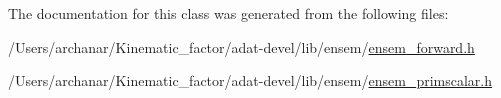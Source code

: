 The documentation for this class was generated from the following files\+:\begin{DoxyCompactItemize}
\item 
/\+Users/archanar/\+Kinematic\+\_\+factor/adat-\/devel/lib/ensem/\mbox{\hyperlink{adat-devel_2lib_2ensem_2ensem__forward_8h}{ensem\+\_\+forward.\+h}}\item 
/\+Users/archanar/\+Kinematic\+\_\+factor/adat-\/devel/lib/ensem/\mbox{\hyperlink{adat-devel_2lib_2ensem_2ensem__primscalar_8h}{ensem\+\_\+primscalar.\+h}}\end{DoxyCompactItemize}
